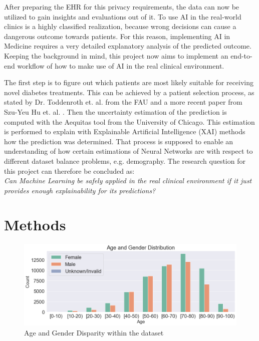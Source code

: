 \documentclass[journal]{IEEEtran}
\begin{document}
After preparing the EHR for this privacy requirements, the data can now be utilized to gain insights and evaluations out of it. To use AI in the real-world clinics is a highly classified realization, because wrong decisions can cause a dangerous outcome towards patients. For this reason, implementing AI in Medicine requires a very detailed explanatory analysis of the predicted outcome. Keeping the background in mind, this project now aims to implement an end-to-end workflow of how to make use of AI in the real clinical environment. 

The first step is to figure out which patients are most likely suitable for receiving novel diabetes treatments. This can be achieved by a patient selection process, as stated by Dr. Toddenroth et. al. from the FAU \cite{cite4} and a more recent paper from Szu-Yeu Hu et. al. \cite{cite3}. Then the uncertainty estimation of the prediction is computed with the Aequitas tool from the University of Chicago. This estimation is performed to explain with Explainable Artificial Intelligence (XAI) methods how the prediction was determined. That process is supposed to enable an understanding of how certain estimations of Neural Networks are with respect to different dataset balance problems, e.g. demography. The research question for this project can therefore be concluded as: \\

\textit{Can Machine Learning be safely applied in the real clinical environment if it just provides enough explainability for its predictions?} 

\section{Methods}
\begin{figure}
	\centering
	\includegraphics[width=1\linewidth]{../imgs/age_new}
	\caption{Age and Gender Disparity within the dataset}
	\label{fig:age}
\end{figure}
\end{document}
